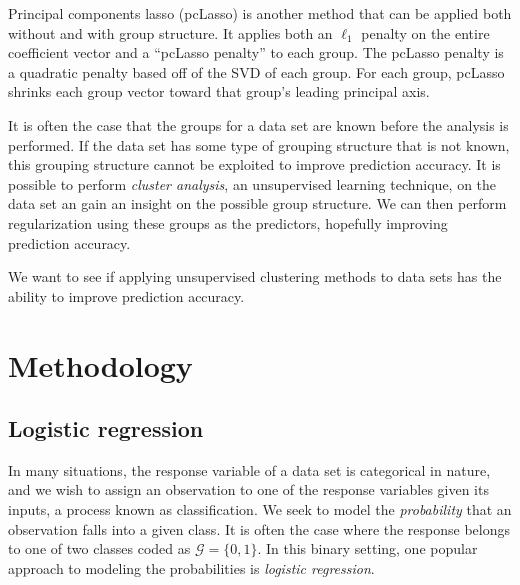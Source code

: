 \documentclass[11pt]{article}
\begin{document}
Principal components lasso (pcLasso) \cite{2018arXiv181004651T} is another method that can be applied both without and with group structure. It applies both an $\ell_1$ penalty on the entire coefficient vector and a ``pcLasso penalty'' to each group. The pcLasso penalty is a quadratic penalty based off of the SVD of each group. For each group, pcLasso shrinks each group vector toward that group's leading principal axis. %

It is often the case that the groups for a data set are known before the analysis is performed. If the data set has some type of grouping structure that is not known, this grouping structure cannot be exploited to improve prediction accuracy. It is possible to perform \textit{cluster analysis}, an unsupervised learning technique, on the data set an gain an insight on the possible group structure. We can then perform regularization using these groups as the predictors, hopefully improving prediction accuracy. 

We want to see if applying unsupervised clustering methods to data sets has the ability to improve prediction accuracy. 



\section{Methodology}

\subsection{Logistic regression}

In many situations, the response variable of a data set is categorical in nature, and we wish to assign an observation to one of the response variables given its inputs, a process known as classification. We seek to model the \textit{probability} that an observation falls into a given class. It is often the case where the response belongs to one of two classes coded as $\mathcal{G} = \{ 0,1 \}$. In this binary setting, one popular approach to modeling the probabilities is \textit{logistic regression}.
\end{document}
